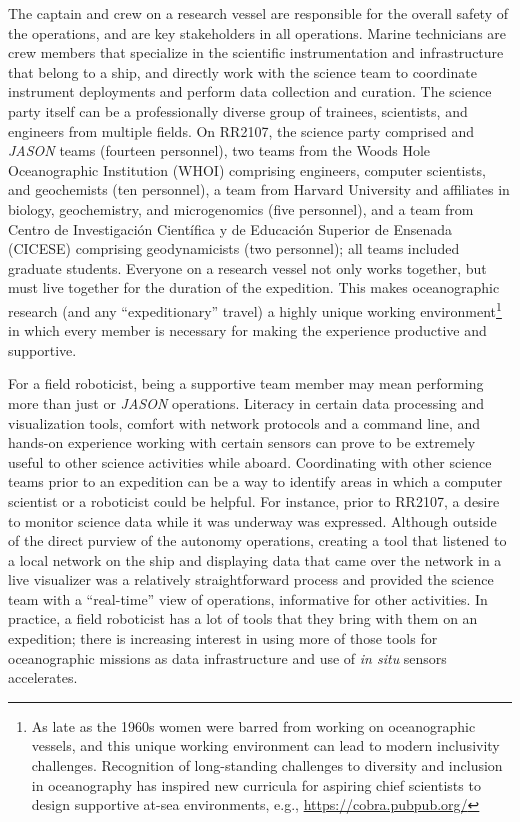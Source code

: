 The captain and crew on a research vessel are responsible for the overall safety of the operations, and are key stakeholders in all operations. Marine technicians are crew members that specialize in the scientific instrumentation and infrastructure that belong to a ship, and directly work with the science team to coordinate instrument deployments and perform data collection and curation. The science party itself can be a professionally diverse group of trainees, scientists, and engineers from multiple fields. On RR2107, the science party comprised \Sentry and \emph{JASON} teams (fourteen personnel), two teams from the Woods Hole Oceanographic Institution (WHOI) comprising engineers, computer scientists, and geochemists (ten personnel), a team from Harvard University and affiliates in biology, geochemistry, and microgenomics (five personnel), and a team from Centro de Investigaci\'on Cient\'ifica y de Educaci\'on Superior de Ensenada (CICESE) comprising geodynamicists (two personnel); all teams included graduate students. Everyone on a research vessel not only works together, but must live together for the duration of the expedition. This makes oceanographic research (and any ``expeditionary'' travel) a highly unique working environment\footnote{As late as the 1960s women were barred from working on oceanographic vessels, and this unique working environment can lead to modern inclusivity challenges. Recognition of long-standing challenges to diversity and inclusion in oceanography has inspired new curricula for aspiring chief scientists to design supportive at-sea environments, e.g., \url{https://cobra.pubpub.org/}} in which every member is necessary for making the experience productive and supportive.  

For a field roboticist, being a supportive team member may mean performing more than just \Sentry or \emph{JASON} operations. Literacy in certain data processing and visualization tools, comfort with network protocols and a command line, and hands-on experience working with certain sensors can prove to be extremely useful to other science activities while aboard. Coordinating with other science teams prior to an expedition can be a way to identify areas in which a computer scientist or a roboticist could be helpful. For instance, prior to RR2107, a desire to monitor \Sentry science data while it was underway was expressed. Although outside of the direct purview of the autonomy operations, creating a tool that listened to a local network on the ship and displaying data that came over the network in a live visualizer was a relatively straightforward process and provided the science team with a ``real-time'' view of \Sentry operations, informative for other activities. In practice, a field roboticist has a lot of tools that they bring with them on an expedition; there is increasing interest in using more of those tools for oceanographic missions as data infrastructure and use of \emph{in situ} sensors accelerates.  

